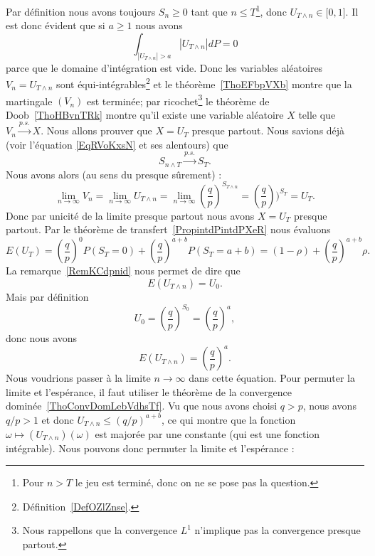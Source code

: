 Par définition nous avons toujours \( S_n\geq 0\) tant que \( n\leq T\)\footnote{Pour \( n>T\) le jeu est terminé, donc on ne se pose pas la question.}, donc \( U_{T\wedge n}\in\mathopen[ 0 , 1 \mathclose]\). Il est donc évident que si \( a\geq 1\) nous avons
\begin{equation}
    \int_{| U_{T\wedge n} |>a}| U_{T\wedge n} |dP=0
\end{equation}
parce que le domaine d'intégration est vide. Donc les variables aléatoires \( V_n=U_{T\wedge n}\) sont équi-intégrables\footnote{Définition~\ref{DefOZlZnse}.} et le théorème~\ref{ThoEFbpVXb} montre que la martingale \( (V_n)\) est terminée; par ricochet\footnote{Nous rappellons que la convergence \( L^1\) n'implique pas la convergence presque partout.} le théorème de Doob~\ref{ThoHBvnTRk} montre qu'il existe une variable aléatoire \( X\) telle que $V_n\stackrel{p.s.}{\longrightarrow}X$. Nous allons prouver que \( X=U_T\) presque partout. Nous savions déjà (voir l'équation \eqref{EqRVoKxsN} et ses alentours) que
\begin{equation}
    S_{n\wedge T}\stackrel{p.s.}{\longrightarrow}S_T.
\end{equation}
Nous avons alors (au sens du presque sûrement) :
\begin{equation}
    \lim_{n\to \infty} V_n=\lim_{n\to \infty} U_{T\wedge n}=\lim_{n\to \infty} \left( \frac{ q }{ p } \right)^{S_{T\wedge n}}=\left( \frac{ q }{ p } \right))^{S_T}=U_T.
\end{equation}
Donc par unicité de la limite presque partout nous avons \( X=U_T\) presque partout. Par le théorème de transfert~\ref{PropintdPintdPXeR} nous évaluons
\begin{equation}    \label{EqYFycUag}
    E(U_T)=\left( \frac{ q }{ p } \right)^0P(S_T=0)+\left( \frac{ q }{ p } \right)^{a+b}P(S_T=a+b)=(1-\rho)+\left( \frac{ q }{ p } \right)^{a+b}\rho.
\end{equation}
La remarque~\ref{RemKCdpnid} nous permet de dire que
\begin{equation}
    E(U_{T\wedge n})=U_0.
\end{equation}
Mais par définition
\begin{equation}
    U_0=\left( \frac{ q }{ p } \right)^{S_0}=\left( \frac{ q }{ p } \right)^a,
\end{equation}
donc nous avons
\begin{equation}
    E(U_{T\wedge n})=\left( \frac{ q }{ p } \right)^a.
\end{equation}
Nous voudrions passer à la limite \( n\to \infty\) dans cette équation. Pour permuter la limite et l'espérance, il faut utiliser le théorème de la convergence dominée~\ref{ThoConvDomLebVdhsTf}. Vu que nous avons choisi \( q>p\), nous avons \( q/p>1\) et donc \( U_{T\wedge n}\leq (q/p)^{a+b}\), ce qui montre que la fonction \( \omega\mapsto (U_{T\wedge n})(\omega)\) est majorée par une constante (qui est une fonction intégrable). Nous pouvons donc permuter la limite et l'espérance :
